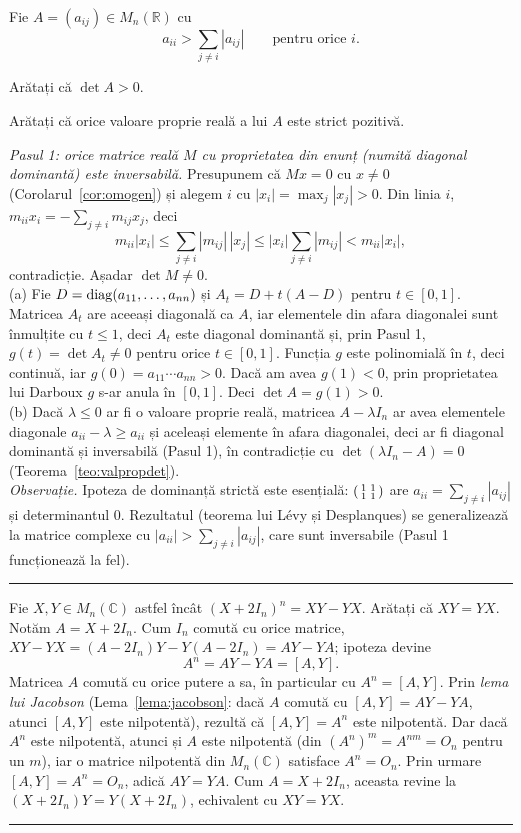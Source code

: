 Fie $A=(a_{ij})\in M_n(\mathbb{R})$ cu
\[ a_{ii}>\sum_{j\neq i}|a_{ij}|\qquad\text{pentru orice } i. \]
\begin{parti}
  \item Arătați că $\det A>0$.
  \item Arătați că orice valoare proprie reală a lui $A$ este strict pozitivă.
\end{parti}
\sol \emph{Pasul 1: orice matrice reală $M$ cu proprietatea din enunț (numită diagonal dominantă) este inversabilă.} Presupunem că $Mx=0$ cu $x\neq0$ (Corolarul~\ref{cor:omogen}) și alegem $i$ cu $|x_i|=\max_j|x_j|>0$. Din linia $i$, $m_{ii}x_i=-\sum_{j\neq i}m_{ij}x_j$, deci
\[ m_{ii}|x_i|\le\sum_{j\neq i}|m_{ij}|\,|x_j|\le|x_i|\sum_{j\neq i}|m_{ij}|<m_{ii}|x_i|, \]
contradicție. Așadar $\det M\neq0$.\\[2pt]
(a) Fie $D=\operatorname{diag}(a_{11},\dots,a_{nn})$ și $A_t=D+t(A-D)$ pentru $t\in[0,1]$. Matricea $A_t$ are aceeași diagonală ca $A$, iar elementele din afara diagonalei sunt înmulțite cu $t\le1$, deci $A_t$ este diagonal dominantă și, prin Pasul 1, $g(t)=\det A_t\neq0$ pentru orice $t\in[0,1]$. Funcția $g$ este polinomială în $t$, deci continuă, iar $g(0)=a_{11}\cdots a_{nn}>0$. Dacă am avea $g(1)<0$, prin proprietatea lui Darboux $g$ s-ar anula în $[0,1]$. Deci $\det A=g(1)>0$.\\[2pt]
(b) Dacă $\lambda\le0$ ar fi o valoare proprie reală, matricea $A-\lambda I_n$ ar avea elementele diagonale $a_{ii}-\lambda\ge a_{ii}$ și aceleași elemente în afara diagonalei, deci ar fi diagonal dominantă și inversabilă (Pasul 1), în contradicție cu $\det(\lambda I_n-A)=0$ (Teorema~\ref{teo:valpropdet}).\\[2pt]
\emph{Observație.} Ipoteza de dominanță strictă este esențială: $\begin{psmallmatrix}1&1\\1&1\end{psmallmatrix}$ are $a_{ii}=\sum_{j\neq i}|a_{ij}|$ și determinantul $0$. Rezultatul (teorema lui Lévy și Desplanques) se generalizează la matrice complexe cu $|a_{ii}|>\sum_{j\neq i}|a_{ij}|$, care sunt inversabile (Pasul 1 funcționează la fel).
\vspace{1mm}\hrule

Fie $X,Y\in M_n(\mathbb{C})$ astfel încât $(X+2I_n)^n=XY-YX$. Arătați că $XY=YX$.
\sol Notăm $A=X+2I_n$. Cum $I_n$ comută cu orice matrice, $XY-YX=(A-2I_n)Y-Y(A-2I_n)=AY-YA$; ipoteza devine
\[ A^n=AY-YA=[A,Y]. \]
Matricea $A$ comută cu orice putere a sa, în particular cu $A^n=[A,Y]$. Prin \emph{lema lui Jacobson} (Lema~\ref{lema:jacobson}: dacă $A$ comută cu $[A,Y]=AY-YA$, atunci $[A,Y]$ este nilpotentă), rezultă că $[A,Y]=A^n$ este nilpotentă. Dar dacă $A^n$ este nilpotentă, atunci și $A$ este nilpotentă (din $(A^n)^m=A^{nm}=O_n$ pentru un $m$), iar o matrice nilpotentă din $M_n(\mathbb{C})$ satisface $A^n=O_n$. Prin urmare $[A,Y]=A^n=O_n$, adică $AY=YA$. Cum $A=X+2I_n$, aceasta revine la $(X+2I_n)Y=Y(X+2I_n)$, echivalent cu $XY=YX$.
\vspace{1mm}\hrule

